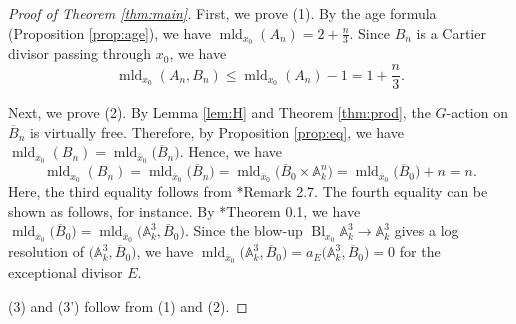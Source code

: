 \documentclass[a4paper,11pt]{amsart}
\theoremstyle{definition}
\theoremstyle{remark}
\begin{document}
\begin{proof}[Proof of Theorem \ref{thm:main}]
First, we prove (1). 
By the age formula (Proposition \ref{prop:age}), we have $\operatorname{mld}_{x_0}(A_n) = 2 + \frac{n}{3}$. 
Since $B_n$ is a Cartier divisor passing through $x_0$, we have 
\[
\operatorname{mld}_{x_0}(A_n, B_n) \le \operatorname{mld}_{x_0}(A_n) - 1 = 1 + \frac{n}{3}. 
\]

Next, we prove (2). 
By Lemma \ref{lem:H} and Theorem \ref{thm:prod}, the $G$-action on $\overline{B}_n$ is virtually free. 
Therefore, by Proposition \ref{prop:eq}, we have $\operatorname{mld}_{x_0}(B_n) = \operatorname{mld}_{\overline{x}_0} \bigl( \overline{B}_n \bigr)$. 
Hence, we have
\[
\operatorname{mld}_{x_0}(B_n) 
= \operatorname{mld}_{\overline{x}_0} \bigl( \overline{B}_n \bigr) 
= \operatorname{mld}_{\overline{x}_0} \bigl( \overline{B}_0 \times \mathbb{A}^n _k \bigr)
= \operatorname{mld}_{\overline{x}_0} \bigl( \overline{B}_0 \bigr) + n 
= n. 
\]
Here, the third equality follows from \cite{Amb99}*{Remark 2.7}. 
The fourth equality can be shown as follows, for instance. 
By \cite{EMY03}*{Theorem 0.1}, 
we have $\operatorname{mld}_{\overline{x}_0} \bigl( \overline{B}_0 \bigr) = 
\operatorname{mld}_{\overline{x}_0} \bigl( \mathbb{A}^3 _k, \overline{B}_0 \bigr)$. 
Since the blow-up $\operatorname{Bl}_{x_0} \mathbb{A}^3 _k \to \mathbb{A}^3 _k$ gives a log resolution of $\bigl( \mathbb{A}^3 _k, \overline{B}_0 \bigr)$, we have 
$\operatorname{mld}_{\overline{x}_0} \bigl( \mathbb{A}^3 _k, \overline{B}_0 \bigr) = 
a_E \bigl( \mathbb{A}^3 _k, \overline{B}_0 \bigr) = 0$ for the exceptional divisor $E$. 

(3) and (3') follow from (1) and (2). 
\end{proof}
\end{document}
